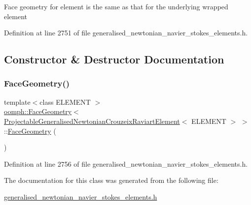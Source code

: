 Face geometry for element is the same as that for the underlying wrapped element 

Definition at line 2751 of file generalised\+\_\+newtonian\+\_\+navier\+\_\+stokes\+\_\+elements.\+h.



\subsection{Constructor \& Destructor Documentation}
\mbox{\label{classoomph_1_1FaceGeometry_3_01ProjectableGeneralisedNewtonianCrouzeixRaviartElement_3_01ELEMENT_01_4_01_4_a07471ca209a75a458300ccce4cd7a685}} 
\subsubsection{\texorpdfstring{Face\+Geometry()}{FaceGeometry()}}
{\footnotesize\ttfamily template$<$class E\+L\+E\+M\+E\+NT $>$ \\
\hyperlink{classoomph_1_1FaceGeometry}{oomph\+::\+Face\+Geometry}$<$ \hyperlink{classoomph_1_1ProjectableGeneralisedNewtonianCrouzeixRaviartElement}{Projectable\+Generalised\+Newtonian\+Crouzeix\+Raviart\+Element}$<$ E\+L\+E\+M\+E\+NT $>$ $>$\+::\hyperlink{classoomph_1_1FaceGeometry}{Face\+Geometry} (\begin{DoxyParamCaption}{ }\end{DoxyParamCaption})\hspace{0.3cm}{\ttfamily [inline]}}



Definition at line 2756 of file generalised\+\_\+newtonian\+\_\+navier\+\_\+stokes\+\_\+elements.\+h.



The documentation for this class was generated from the following file\+:\begin{DoxyCompactItemize}
\item 
\hyperlink{generalised__newtonian__navier__stokes__elements_8h}{generalised\+\_\+newtonian\+\_\+navier\+\_\+stokes\+\_\+elements.\+h}\end{DoxyCompactItemize}
